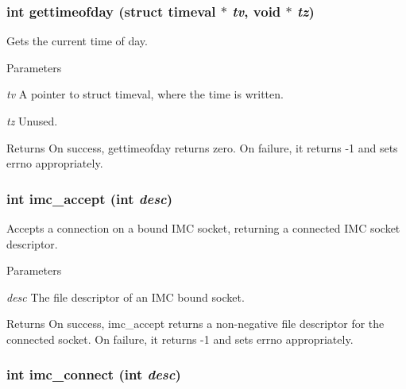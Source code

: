 \hypertarget{group__syscalls_ga2f316a4ad94a242df56b01953677015d}{
\subsubsection[{gettimeofday}]{\setlength{\rightskip}{0pt plus 5cm}int gettimeofday (struct timeval $\ast$ {\em tv}, \/  void $\ast$ {\em tz})}}
\label{group__syscalls_ga2f316a4ad94a242df56b01953677015d}
Gets the current time of day. 
\begin{DoxyParams}{Parameters}
\item[{\em tv}]A pointer to struct timeval, where the time is written. \item[{\em tz}]Unused. \end{DoxyParams}
\begin{DoxyReturn}{Returns}
On success, gettimeofday returns zero. On failure, it returns -\/1 and sets errno appropriately. 
\end{DoxyReturn}
\hypertarget{group__syscalls_gab16585276c20a165a3b70df3eb7b21b8}{
\subsubsection[{imc\_\-accept}]{\setlength{\rightskip}{0pt plus 5cm}int imc\_\-accept (int {\em desc})}}
\label{group__syscalls_gab16585276c20a165a3b70df3eb7b21b8}
Accepts a connection on a bound IMC socket, returning a connected IMC socket descriptor. 
\begin{DoxyParams}{Parameters}
\item[{\em desc}]The file descriptor of an IMC bound socket. \end{DoxyParams}
\begin{DoxyReturn}{Returns}
On success, imc\_\-accept returns a non-\/negative file descriptor for the connected socket. On failure, it returns -\/1 and sets errno appropriately. 
\end{DoxyReturn}
\hypertarget{group__syscalls_ga8d0d3a853d9db5850b9996111a81455c}{
\subsubsection[{imc\_\-connect}]{\setlength{\rightskip}{0pt plus 5cm}int imc\_\-connect (int {\em desc})}}
